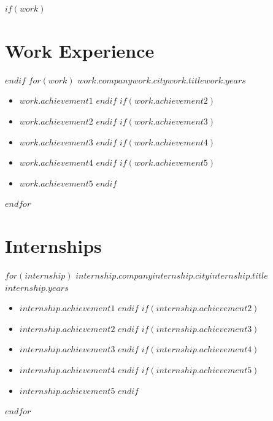 \documentclass[11pt]{cv-class}
\begin{document}


$if(work)$ \section{Work Experience} $endif$
$for(work)$
    \noindent\textbf{$work.company$}\hfill{$work.city$}\break\textit{$work.title$}\hfill{$work.years$}
    \begin{itemize}[noitemsep,nolistsep,leftmargin=*]
        $if(work.achievement1)$ \item \raggedright{$work.achievement1$} $endif$
        $if(work.achievement2)$ \item \raggedright{$work.achievement2$} $endif$
        $if(work.achievement3)$ \item \raggedright{$work.achievement3$} $endif$
        $if(work.achievement4)$ \item \raggedright{$work.achievement4$} $endif$
        $if(work.achievement5)$ \item \raggedright{$work.achievement5$} $endif$
    \end{itemize}
    \bigskip
$endfor$

\section{Internships}
$for(internship)$
    \noindent\textbf{$internship.company$}\hfill{$internship.city$}\break\textit{$internship.title$}\hfill{$internship.years$}
    \begin{itemize}[noitemsep,nolistsep,leftmargin=*]
        $if(internship.achievement1)$ \item \raggedright{$internship.achievement1$} $endif$
        $if(internship.achievement2)$ \item \raggedright{$internship.achievement2$} $endif$
        $if(internship.achievement3)$ \item \raggedright{$internship.achievement3$} $endif$
        $if(internship.achievement4)$ \item \raggedright{$internship.achievement4$} $endif$
        $if(internship.achievement5)$ \item \raggedright{$internship.achievement5$} $endif$
    \end{itemize}
    \bigskip
$endfor$
\end{document}
